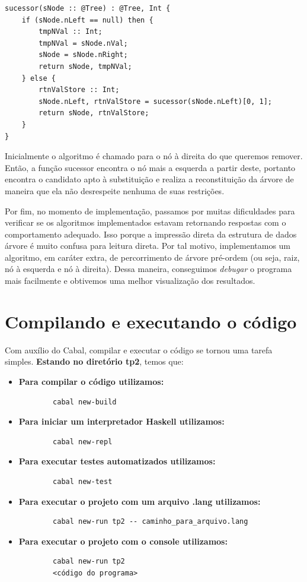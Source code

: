\documentclass{article}
\begin{document}
\begin{verbatim}
sucessor(sNode :: @Tree) : @Tree, Int {
    if (sNode.nLeft == null) then {
        tmpNVal :: Int;
        tmpNVal = sNode.nVal;
        sNode = sNode.nRight;
        return sNode, tmpNVal;
    } else {
        rtnValStore :: Int;
        sNode.nLeft, rtnValStore = sucessor(sNode.nLeft)[0, 1];
        return sNode, rtnValStore;
    }
}
\end{verbatim}

Inicialmente o algoritmo é chamado para o nó à direita do que queremos remover. Então, a função sucessor encontra o nó mais a esquerda a partir deste, portanto encontra o candidato apto à substituição e realiza a reconstituição da árvore de maneira que ela não desrespeite nenhuma de suas restrições.

Por fim, no momento de implementação, passamos por muitas dificuldades para verificar se os algoritmos implementados estavam retornando respostas com o comportamento adequado. Isso porque a impressão direta da estrutura de dados árvore é muito confusa para leitura direta. Por tal motivo, implementamos um algoritmo, em caráter extra, de percorrimento de árvore pré-ordem (ou seja, raiz, nó à esquerda e nó à direita). Dessa maneira, conseguimos \textit{debugar} o programa mais facilmente e obtivemos uma melhor visualização dos resultados.

\section{Compilando e executando o código}
Com auxílio do Cabal, compilar e executar o código se tornou uma tarefa simples.
\textbf{Estando no diretório tp2}, temos que:

\begin{itemize}
    \item \textbf{Para compilar o código utilizamos:}
        \begin{verbatim}
        cabal new-build
        \end{verbatim}
    \item \textbf{Para iniciar um interpretador Haskell utilizamos:}
        \begin{verbatim}
        cabal new-repl
        \end{verbatim}
    \item \textbf{Para executar testes automatizados utilizamos:}
        \begin{verbatim}
        cabal new-test
        \end{verbatim}
    \item \textbf{Para executar o projeto com um arquivo .lang utilizamos:}
        \begin{verbatim}
        cabal new-run tp2 -- caminho_para_arquivo.lang
        \end{verbatim}
    \item \textbf{Para executar o projeto com o console utilizamos:}
        \begin{verbatim}
        cabal new-run tp2
        <código do programa>
        \end{verbatim}
\end{itemize}
\end{document}
